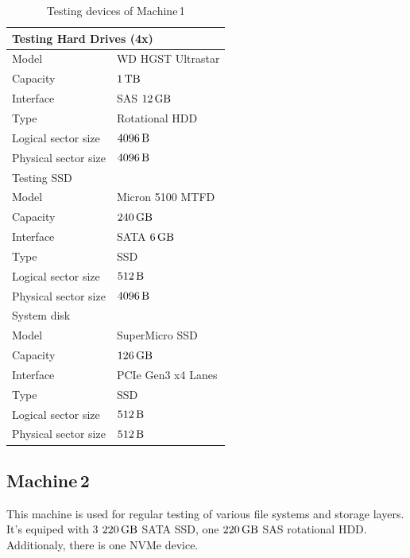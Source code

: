 \documentclass[
  color, %
  table, %
  lof,   %
  lot,   %
]{fithesis3}
\begin{document}
\begin{table}
\centering
\begin{tabular}{|l|l|}
\hline
   \multicolumn{2}{|l|}{Testing Hard Drives (4x)} \\ \hline %
    Model & WD HGST Ultrastar\\
    \hline
    Capacity & $\SI{1}{\tera\byte}$  \\
    \hline
    Interface & SAS $\SI{12}{\giga\byte}$  \\
    \hline
    Type & Rotational HDD \\
    \hline    
    Logical sector size & $\SI{4096}{\byte}$ \\    
    \hline    
    Physical sector size & $\SI{4096}{\byte}$ \\
    \hline
    \hline
    \multicolumn{2}{|l|}{Testing SSD } \\ \hline %
     Model & Micron 5100 MTFD \\
    \hline
     Capacity & $\SI{240}{\giga\byte}$  \\
    \hline
    Interface & SATA $\SI{6}{\giga\byte}$  \\
    \hline
    Type & SSD \\
    \hline    
    Logical sector size & $\SI{512}{\byte}$ \\    
    \hline    
     Physical sector size & $\SI{4096}{\byte}$ \\
    \hline
    \hline
    \multicolumn{2}{|l|}{System disk} \\ \hline %
    Model & SuperMicro SSD  \\
    \hline
    Capacity & $\SI{126}{\giga\byte}$  \\
    \hline
    Interface & PCIe Gen3 x4 Lanes  \\
    \hline
    Type & SSD \\
    \hline    
   Logical sector size & $\SI{512}{\byte}$ \\    
    \hline    
    Physical sector size & $\SI{512}{\byte}$ \\
    \hline   
\end{tabular}
\caption{Testing devices of Machine\,1}
\end{table}


\subsection{Machine\,2}
\label{hw:2}
This machine is used for regular testing of various file systems and storage layers. It's equiped with 3 $\SI{220}{\giga\byte}$ SATA SSD, one $\SI{220}{\giga\byte}$ SAS rotational HDD. Additionaly, there is one NVMe device.
\end{document}
